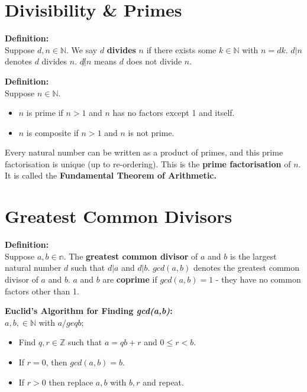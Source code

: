 \documentclass{report}
\newenvironment{frameblue}[1][BlueViolet]
  {\begin{tcolorbox}[colframe=#1,colback=white]}
  {\end{tcolorbox}}
\begin{document}
\section{Divisibility \& Primes}

\begin{frameblue}
    \textbf{Definition:}\\
    Suppose $d, n \in \mathbb{N}$. We say $d$ \textbf{divides} $n$ if there exists some $k \in \mathbb{N}$ with $n=dk$. $d | n$ denotes $d$ divides $n$. $d\not | n $ means $d$ does not divide $n$.
\end{frameblue}

\begin{frameblue}
    \textbf{Definition:}\\
    Suppose $n \in \mathbb{N}$.
    \begin{itemize}
        \item $n$ is prime if $n > 1$ and $n$ has no factors except 1 and itself.
        \item $n$ is composite if $n > 1$ and $n$ is not prime.
    \end{itemize}
\end{frameblue}

Every natural number can be written as a product of primes, and this prime factorisation is unique (up to re-ordering). This is the \textbf{prime factorisation} of $n$. It is called the \textbf{Fundamental Theorem of Arithmetic.}

\section{Greatest Common Divisors}

\begin{frameblue}
    \textbf{Definition:}\\
    Suppose $a,b \in \mathbb{n}$. The \textbf{greatest common divisor} of $a$ and $b$ is the largest natural number $d$ such that $d | a$ and $d | b$. $gcd(a,b)$ denotes the greatest common divisor of $a$ and $b$. $a$ and $b$ are \textbf{coprime} if $gcd(a,b)=1$ - they have no common factors other than 1.
\end{frameblue}
\begin{frameblue}
    \textbf{Euclid's Algorithm for Finding \textit{gcd(a,b)}:}\\
    $a, b, \in \mathbb{N}$ with $a /geq b$;
    \begin{itemize}
        \item Find $q, r \in \mathbb{Z}$ such that $a = qb + r$ and $0 \leq r < b$.
        \item If $r = 0$, then $gcd(a,b) = b$.
        \item If $r > 0$ then replace $a, b$ with $b, r$ and repeat.
    \end{itemize}
\end{frameblue}
\end{document}

